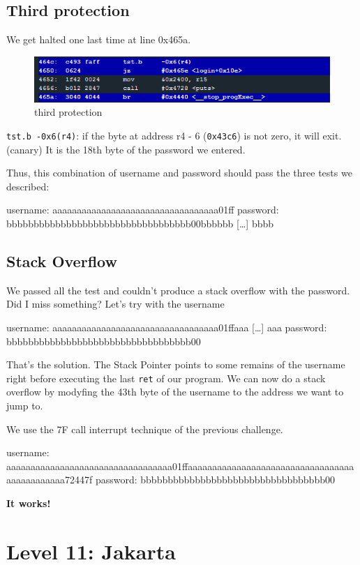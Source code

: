 \documentclass[a4paper,11pt]{article}
\begin{document}
\subsection{Third protection}\label{third-protection}

We get halted one last time at line 0x465a.

\begin{figure}[htbp]
\centering
\includegraphics{img/10_4.PNG}
\caption{third protection}
\end{figure}

\texttt{tst.b -0x6(r4)}: if the byte at address r4 - 6 (\texttt{0x43c6})
is not zero, it will exit. (canary) It is the 18th byte of the password
we entered.

Thus, this combination of username and password should pass the three
tests we described:

username: aaaaaaaaaaaaaaaaaaaaaaaaaaaaaaaaaa01ff password:
bbbbbbbbbbbbbbbbbbbbbbbbbbbbbbbbbb00bbbbbb {[}\ldots{}{]} bbbb

\subsection{Stack Overflow}\label{stack-overflow}

We passed all the test and couldn't produce a stack overflow with the
password. Did I miss something? Let's try with the username

username: aaaaaaaaaaaaaaaaaaaaaaaaaaaaaaaaaa01ffaaa {[}\ldots{}{]} aaa
password: bbbbbbbbbbbbbbbbbbbbbbbbbbbbbbbbbb00

That's the solution. The Stack Pointer points to some remains of the
username right before executing the last \texttt{ret} of our program. We
can now do a stack overflow by modyfing the 43th byte of the username to
the address we want to jump to.

We use the 7F call interrupt technique of the previous challenge.

username:
aaaaaaaaaaaaaaaaaaaaaaaaaaaaaaaaaa01ffaaaaaaaaaaaaaaaaaaaaaaaaaaaaaaaaaaaaaaaaaaaaaa72447f
password: bbbbbbbbbbbbbbbbbbbbbbbbbbbbbbbbbb00

\textbf{It works!}

\section{Level 11: Jakarta}\label{level-11-jakarta}
\end{document}
